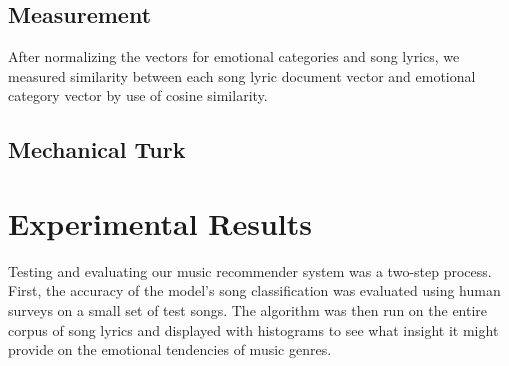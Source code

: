 \documentclass[10pt,twocolumn]{article}
\begin{document}
\subsection{Measurement}

After normalizing the vectors for emotional categories and song lyrics, we measured similarity between each song lyric document vector and emotional category vector by use of cosine similarity.

\subsection{Mechanical Turk}

\section{Experimental Results}
Testing and evaluating our music recommender system was a two-step process. First, the accuracy of the model's song classification was evaluated using human surveys on a small set of test songs. The algorithm was then run on the entire corpus of song lyrics and displayed with histograms to see what insight it might provide on the emotional tendencies of music genres.
\end{document}
